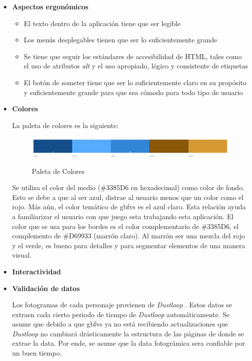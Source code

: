 \begin{itemize}
    \item \textbf{Aspectos ergonómicos}
    \begin{itemize}
        \item El texto dentro de la aplicación tiene que ser legible
        \item Los menús desplegables tienen que ser lo suficientemente grande
        \item Se tiene que seguir los estándares de accesibilidad de HTML, tales como el uso de atributos \textit{alt} y el uso apropiado, lógico y consistente de etiquetas
        \item El botón de someter tiene que ser lo suficientemente claro en su propósito y suficientemente grande para que sea cómodo para todo tipo de usuario
    \end{itemize}
    \item \textbf{Colores}
    
    La paleta de colores es la siguiente:
    \begin{figure}[ht!]
        \centering
        \caption{Paleta de Colores}
        \includegraphics[width=1.0\textwidth]{figures/pallete.png}
        \label{fig: pallete}
    \end{figure}

    Se utiliza el color del medio (\#3385D6 en hexadecimal) como color de fondo. Esto se debe a que al ser azul, distrae al usuario menos que un color como el rojo. Más aún, el color temático de \gls{gbfvs} es el azul claro. Esta relación ayuda a familiarizar el usuario con que juego esta trabajando esta aplicación. El color que se usa para los bordes es el color complementario de \#3385D6, el complemento de \#D69933 (marrón claro). Al marrón ser una mezcla del rojo y el verde, es bueno para detalles y para segmentar elementos de una manera visual.
    \item \textbf{Interactividad}
    \item \textbf{Validación de datos}
    
    Los fotogramas de cada personaje provienen de \textit{Dustloop} \cite{noauthor_granblue_2022-1}. Estos datos se extraen cada cierto periodo de tiempo de \textit{Dustloop} automáticamente. Se asume que debido a que \gls{gbfvs} ya no está recibiendo actualizaciones que \textit{Dustloop} no cambiará drásticamente la estructura de las páginas de donde se extrae la data. Por ende, se asume que la data fotográmica sera confiable por un buen tiempo.


\end{itemize}
